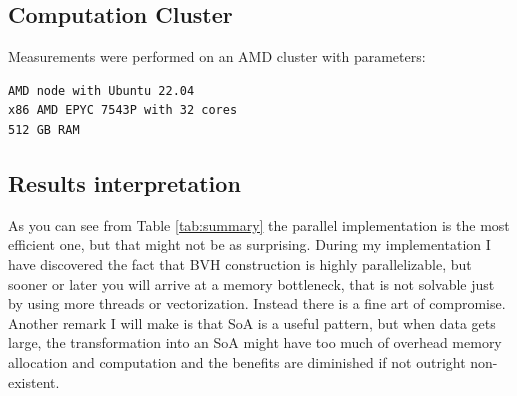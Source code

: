 \documentclass[10pt,a4paper,twocolumn]{article}
\begin{document}
\subsection{Computation Cluster}
Measurements were performed on an AMD cluster with parameters:
\begin{lstlisting}
AMD node with Ubuntu 22.04
x86 AMD EPYC 7543P with 32 cores
512 GB RAM
\end{lstlisting}

\subsection{Results interpretation}
As you can see from Table \ref{tab:summary} the parallel implementation is the most efficient one, but that might not be as surprising. During my implementation I have discovered the fact that BVH construction is highly parallelizable, but sooner or later you will arrive at a memory bottleneck, that is not solvable just by using more threads or vectorization. Instead there is a fine art of compromise. Another remark I will make is that SoA is a useful pattern, but when data gets large, the transformation into an SoA might have too much of overhead memory allocation and computation and the benefits are diminished if not outright non-existent.
\end{document}
